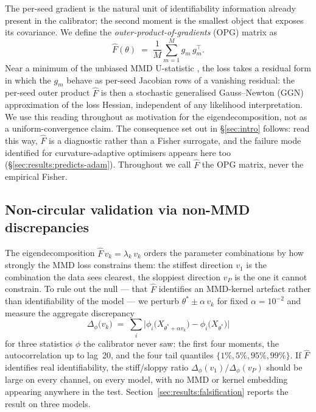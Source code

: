 The per-seed gradient is the natural unit of identifiability
information already present in the calibrator; the second moment is
the smallest object that exposes its covariance. We define the
\emph{outer-product-of-gradients} (OPG) matrix as
\begin{equation}
\label{eq:opg}
\widehat{F}(\theta) \;=\; \frac{1}{M} \sum_{m=1}^{M} g_m\, g_m^{\top}.
\end{equation}
Near a minimum of the unbiased MMD U-statistic
\citep{gretton_mmd_2012}, the loss takes a residual form in which the
$g_m$ behave as per-seed Jacobian rows of a vanishing residual: the
per-seed outer product $\widehat F$ is then a stochastic generalised
Gauss--Newton (GGN) approximation of the loss Hessian, independent of
any likelihood interpretation. We use this reading throughout as
motivation for the eigendecomposition, not as a uniform-convergence
claim. The consequence set out in \S\ref{sec:intro} follows: read this
way, $\widehat F$ is a diagnostic rather than a Fisher surrogate, and
the failure mode \citet{kunstner_opg_2019} identified for
curvature-adaptive optimisers appears here too
(\S\ref{sec:results:predicts-adam}). Throughout we call $\widehat F$
the OPG matrix, never the empirical Fisher.

\subsection{Non-circular validation via non-MMD discrepancies}
\label{sec:method:falsification}

The eigendecomposition $\widehat F\, v_k = \lambda_k\, v_k$ orders the
parameter combinations by how strongly the MMD loss constrains them:
the stiffest direction $v_1$ is the combination the data sees
clearest, the sloppiest direction $v_P$ is the one it cannot
constrain. To rule out the null --- that $\widehat F$ identifies an
MMD-kernel artefact rather than identifiability of the model --- we
perturb $\theta^* \pm \alpha\, v_k$ for fixed $\alpha = 10^{-2}$ and
measure the aggregate discrepancy
\begin{equation}
\label{eq:disc}
\Delta_{\phi}\!\bigl(v_k\bigr) \;=\; \sum_i \bigl| \phi_i\bigl(X_{\theta^* + \alpha v_k}\bigr) - \phi_i\bigl(X_{\theta^*}\bigr) \bigr|
\end{equation}
for three statistics $\phi$ the calibrator never saw: the first four
moments, the autocorrelation up to lag~20, and the four tail quantiles
$\{1\%, 5\%, 95\%, 99\%\}$. If $\widehat F$ identifies real
identifiability, the stiff/sloppy ratio
$\Delta_\phi(v_1) / \Delta_\phi(v_P)$ should be large on every
channel, on every model, with no MMD or kernel embedding appearing
anywhere in the test. Section~\ref{sec:results:falsification} reports
the result on three models.
